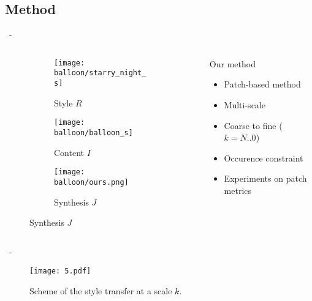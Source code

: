 \documentclass[aspectratio=169, 22pt]{beamer}
\begin{document}
\subsection{Method}
\begin{frame}{\secname~- \subsecname}
  \begin{columns}
    \begin{column}{0.4\linewidth}
      \begin{figure}
        \centering
        \begin{subfigure}{0.45\linewidth}\centering
          \texttt{[image: balloon/starry\_night\_s]}
          \caption{Style $R$}
        \end{subfigure}
        \begin{subfigure}{0.45\linewidth}\centering        
          \texttt{[image: balloon/balloon\_s]}
          \caption{Content $I$}
        \end{subfigure}

        \begin{subfigure}{0.8\linewidth}\centering
          \texttt{[image: balloon/ours.png]}
          \caption{Synthesis $J$}
        \end{subfigure}
      \end{figure}
    \end{column}
    \begin{column}{0.6\linewidth}
      \begin{exampleblock}{Our method}
        \begin{itemize}
        \item Patch-based method
        \item Multi-scale
        \item Coarse to fine ($k=N..0$)
          \vspace{1em}
          \pause
        \item \alert{Occurence constraint}
        \item \alert{Experiments on patch metrics}
        \end{itemize}
      \end{exampleblock}
    \end{column}
  \end{columns}
\end{frame}

\begin{frame}{\secname~- \subsecname}
  \begin{figure}
    \centering
    \texttt{[image: 5.pdf]}
    \caption{Scheme of the style transfer at a scale $k$.}
  \end{figure}
\end{frame}
\end{document}
